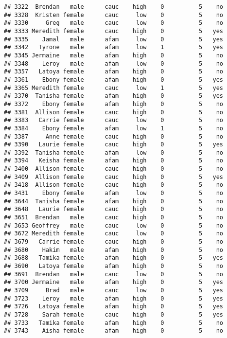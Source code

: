 \documentclass[
]{article}
\begin{document}
\begin{verbatim}
## 3322  Brendan   male      cauc    high    0          5    no
## 3328  Kristen female      cauc     low    0          5    no
## 3330     Greg   male      cauc     low    0          5    no
## 3333 Meredith female      cauc    high    0          5   yes
## 3335    Jamal   male      afam     low    0          5   yes
## 3342   Tyrone   male      afam     low    1          5   yes
## 3345 Jermaine   male      afam    high    0          5    no
## 3348    Leroy   male      afam     low    0          5    no
## 3357   Latoya female      afam    high    0          5    no
## 3361    Ebony female      afam    high    0          5   yes
## 3365 Meredith female      cauc     low    1          5   yes
## 3370  Tanisha female      afam    high    0          5   yes
## 3372    Ebony female      afam    high    0          5    no
## 3381  Allison female      cauc    high    0          5    no
## 3383   Carrie female      cauc     low    0          5    no
## 3384    Ebony female      afam     low    1          5    no
## 3387     Anne female      cauc    high    0          5    no
## 3390   Laurie female      cauc    high    0          5   yes
## 3392  Tanisha female      afam     low    0          5    no
## 3394   Keisha female      afam    high    0          5    no
## 3400  Allison female      cauc    high    0          5    no
## 3409  Allison female      cauc    high    0          5   yes
## 3418  Allison female      cauc    high    0          5    no
## 3431    Ebony female      afam     low    0          5    no
## 3644  Tanisha female      afam    high    0          5    no
## 3648   Laurie female      cauc    high    0          5    no
## 3651  Brendan   male      cauc    high    0          5    no
## 3653 Geoffrey   male      cauc     low    0          5    no
## 3672 Meredith female      cauc     low    0          5    no
## 3679   Carrie female      cauc    high    0          5    no
## 3680    Hakim   male      afam    high    0          5    no
## 3688   Tamika female      afam    high    0          5   yes
## 3690   Latoya female      afam    high    0          5    no
## 3691  Brendan   male      cauc     low    0          5    no
## 3700 Jermaine   male      afam    high    0          5   yes
## 3709     Brad   male      cauc     low    0          5   yes
## 3723    Leroy   male      afam    high    0          5   yes
## 3726   Latoya female      afam    high    0          5   yes
## 3728    Sarah female      cauc    high    0          5   yes
## 3733   Tamika female      afam    high    0          5    no
## 3743    Aisha female      afam    high    0          5    no

\end{verbatim}
\end{document}
